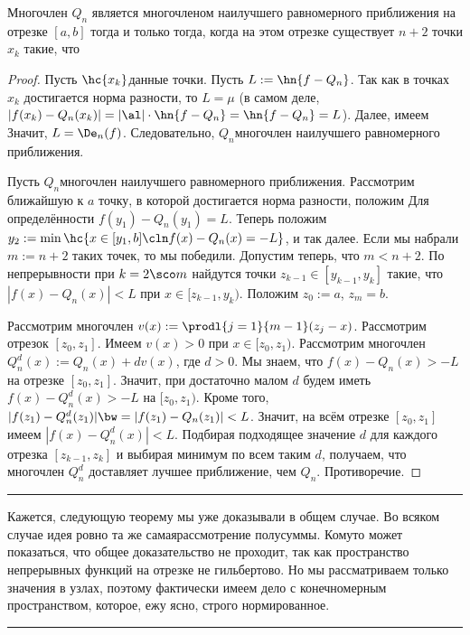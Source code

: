 \documentclass[a4paper]{article}
\newenvironment{petit}{\medskip\hrule\smallskip\footnotesize}{\par\smallskip\hrule\medskip}
\begin{document}
\begin{theorem}[Чебышёв]
Многочлен $Q_n$ является многочленом наилучшего равномерного приближения на отрезке $[a,b]$ тогда и только
тогда, когда на этом отрезке существует $n+2$ точки $x_k$ такие, что
\end{theorem}
\begin{proof}

\framebox{$\Lar$}
Пусть $\hc{x_k}$\т данные точки. Пусть $L := \hn{f-Q_n}$. Так как в точках $x_k$ достигается норма разности,
то $L = \mu$ (в самом деле, $|f(x_k) -Q_n(x_k)| = |\al| \cdot \hn{f-Q_n} = \hn{f-Q_n} = L$).
Далее, имеем
Значит, $L = \De_n(f)$. Следовательно, $Q_n$\т многочлен наилучшего равномерного приближения.

\framebox{$\Ra$} Пусть $Q_n$\т многочлен наилучшего равномерного приближения. Рассмотрим ближайшую к $a$ точку,
в которой достигается норма разности,  положим
 Для определённости $f(y_1)-Q_n(y_1) = L$. Теперь положим
$y_2 := \min\hc{x\in [y_1,b]\cln f(x)-Q_n(x) =-L}$, и так далее. Если мы набрали $m := n+2$ таких точек, то мы победили.
Допустим теперь, что $m < n+2$. По непрерывности при $k=2\sco m$ найдутся точки $z_{k-1} \in [y_{k-1},y_k]$ такие, что
$|f(x)-Q_n(x)| < L$ при $x\in [z_{k-1},y_k)$. Положим $z_0 := a$, $z_m = b$.

Рассмотрим многочлен $v(x) := \prodl{j=1}{m-1}(z_j-x)$. Рассмотрим  отрезок $[z_0,z_1]$. Имеем $v(x) > 0$ при $x\in [z_0,z_1)$.
Рассмотрим многочлен $Q_n^d(x) := Q_n(x)+d v(x)$, где $d > 0$. Мы знаем, что $f(x)-Q_n(x) > -L$ на отрезке $[z_0,z_1]$.
Значит, при достаточно малом $d$ будем иметь $f(x)-Q_n^d(x)  > -L$ на $[z_0,z_1)$. Кроме того,
$|f(z_1)-Q_n^d(z_1)| \bw= |f(z_1)-Q_n(z_1)| <L$. Значит, на всём отрезке $[z_0,z_1]$ имеем $|f(x)-Q_n^d(x)| < L$.
Подбирая подходящее значение $d$ для каждого отрезка $[z_{k-1},z_k]$ и выбирая минимум по всем таким $d$, получаем, что
многочлен $Q_n^d$ доставляет лучшее приближение, чем $Q_n$. Противоречие.
\end{proof}

\begin{petit}
Кажется, следующую теорему мы уже доказывали в общем случае. Во всяком случае идея ровно та же самая\т рассмотрение полусуммы.
Кому\д то может показаться, что общее доказательство не проходит, так как пространство непрерывных функций на отрезке не гильбертово.
Но мы рассматриваем только значения в узлах, поэтому фактически имеем дело с конечномерным пространством, которое, ежу ясно, строго
нормированное.
\end{petit}
\end{document}
